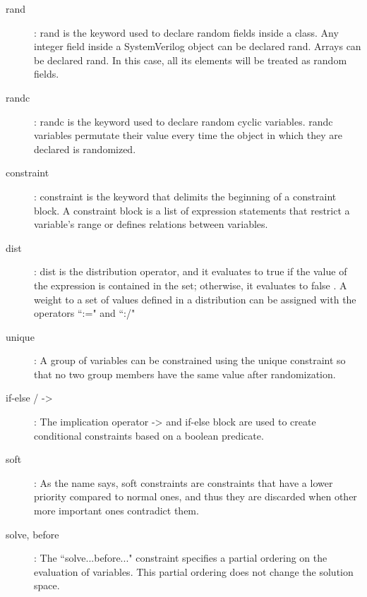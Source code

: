 \begin{description}
    \item [rand] : rand is the keyword used to declare random fields inside a
      class. Any integer field inside a SystemVerilog object can be declared
      rand. Arrays can be declared rand. In this case, all its elements will be
      treated as random fields.
    \item [randc] : randc is the keyword used to declare random cyclic
      variables. randc variables permutate their value every time the object in
      which they are declared is randomized.
    \item [constraint] : constraint is the keyword that delimits the beginning
      of a constraint block. A constraint block is a list of expression
      statements that restrict a variable's range or defines relations between
      variables.
    \item [dist] : dist is the distribution operator, and it evaluates to true
      if the value of the expression is contained in the set; otherwise, it
      evaluates to false \cite{ieee2017ieee}. A weight to a set of values
      defined in a distribution can be assigned with the operators ``:=" and
      ``:/"
    \item[unique] : A group of variables can be constrained using the unique
      constraint so that no two group members have the same value after
      randomization.
    \item [if-else / ->]: The implication operator -> and if-else block are used
      to create conditional constraints based on a boolean predicate.
    \item [soft] : As the name says, soft constraints are constraints that have
      a lower priority compared to normal ones, and thus they are discarded when
      other more important ones contradict them.
    \item [solve, before] : The ``solve...before..." constraint specifies a
      partial ordering on the evaluation of variables. This partial ordering
      does not change the solution space.
\end{description}

